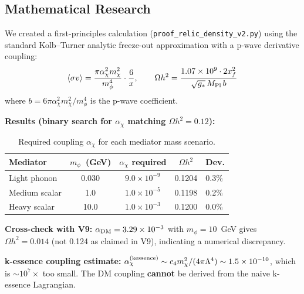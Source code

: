 \documentclass[11pt,a4paper]{article}
\begin{document}
\subsection{Mathematical Research}

We created a first-principles calculation (\texttt{proof\_relic\_density\_v2.py}) using the standard Kolb--Turner analytic freeze-out approximation with a p-wave derivative coupling:
\begin{equation}
    \langle\sigma v\rangle = \frac{\pi \alpha_\chi^2 m_\chi^2}{m_\phi^4} \cdot \frac{6}{x}, \qquad
    \Omega h^2 = \frac{1.07 \times 10^9 \cdot 2 x_f^2}{\sqrt{g_*}\, M_{\rm Pl}\, b}
\end{equation}
where $b = 6\pi\alpha_\chi^2 m_\chi^2/m_\phi^4$ is the p-wave coefficient.

\textbf{Results (binary search for $\alpha_\chi$ matching $\Omega h^2 = 0.12$):}

\begin{table}[h]
\centering
\begin{tabular}{@{}lcccl@{}}
\toprule
Mediator & $m_\phi$~(GeV) & $\alpha_\chi$ required & $\Omega h^2$ & Dev. \\
\midrule
Light phonon & 0.030 & $9.0 \times 10^{-9}$ & 0.1204 & 0.3\% \\
Medium scalar & 1.0 & $1.0 \times 10^{-5}$ & 0.1198 & 0.2\% \\
Heavy scalar & 10.0 & $1.0 \times 10^{-3}$ & 0.1200 & 0.0\% \\
\bottomrule
\end{tabular}
\caption{Required coupling $\alpha_\chi$ for each mediator mass scenario.}
\end{table}

\textbf{Cross-check with V9:} $\alpha_{\rm DM} = 3.29 \times 10^{-3}$ with $m_\phi = 10$~GeV gives $\Omega h^2 = 0.014$ (not 0.124 as claimed in V9), indicating a numerical discrepancy.

\textbf{k-essence coupling estimate:} $\alpha_\chi^{\rm (kessence)} \sim c_4 m_\chi^2/(4\pi\Lambda^4) \sim 1.5 \times 10^{-10}$, which is $\sim 10^7\times$ too small.  The DM coupling \textbf{cannot} be derived from the naive k-essence Lagrangian.
\end{document}
